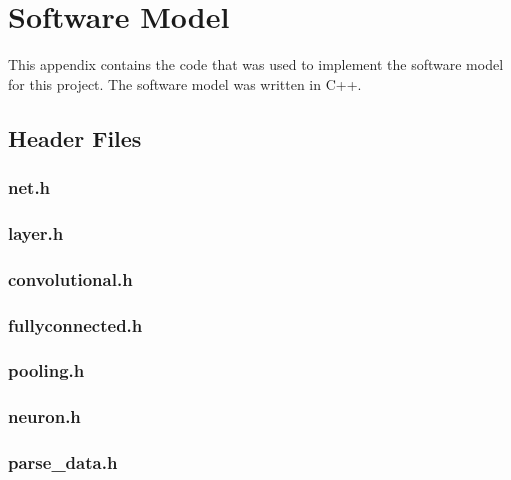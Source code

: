 \chapter{Software Model}\label{app:sw}
This appendix contains the code that was used to implement the software model for this project. The software model was written in C++.
\section{Header Files}

\subsection{net.h}

\pagebreak


\subsection{layer.h}

\pagebreak


\subsection{convolutional.h}

\pagebreak


\subsection{fullyconnected.h}

\pagebreak

\subsection{pooling.h}

\pagebreak


\subsection{neuron.h}

\pagebreak


\subsection{parse\_data.h}

\pagebreak


